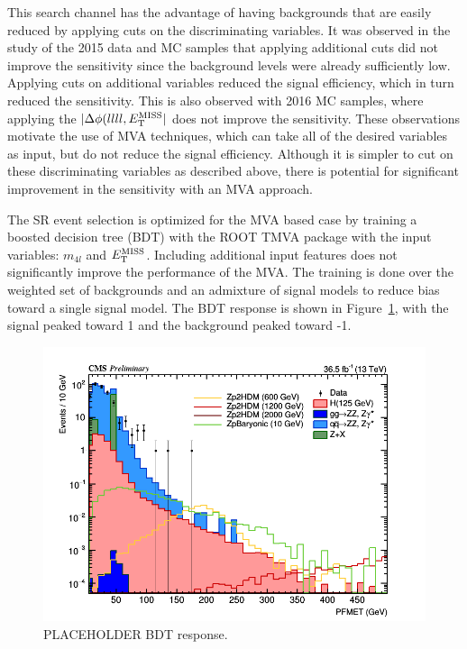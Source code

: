 This search channel has the advantage of having backgrounds that are easily reduced by applying cuts on the discriminating variables. It was observed in the study of the 2015 data and MC samples that applying additional cuts did not improve the sensitivity since the background levels were already sufficiently low. Applying cuts on additional variables reduced the signal efficiency, which in turn reduced the sensitivity. This is also observed with 2016 MC samples, where applying the $|\Delta\phi(llll, E_{\rm{T}}^{\rm{MISS}}|$ does not improve the sensitivity. These observations motivate the use of MVA techniques, which can take all of the desired variables as input, but do not reduce the signal efficiency. Although it is simpler to cut on these discriminating variables as described above, there is potential for significant improvement in the sensitivity with an MVA approach.

The SR event selection is optimized for the MVA based case by training a boosted decision tree (BDT) with the ROOT TMVA package with the input variables: $m_{4l}$ and $E_{\rm{T}}^{\rm{MISS}}$. Including additional input features does not significantly improve the performance of the MVA. The training is done over the weighted set of backgrounds and an admixture of signal models to reduce bias toward a single signal model. The BDT response is shown in Figure~\ref{fig:bdt}, with the signal peaked toward 1 and the background peaked toward -1. 

\begin{figure}[tbh]
\centering
\includegraphics[width=5in]{figures/hist_hPFMET_8.png}
\caption{PLACEHOLDER BDT response.}
\label{fig:bdt}
\end{figure}



